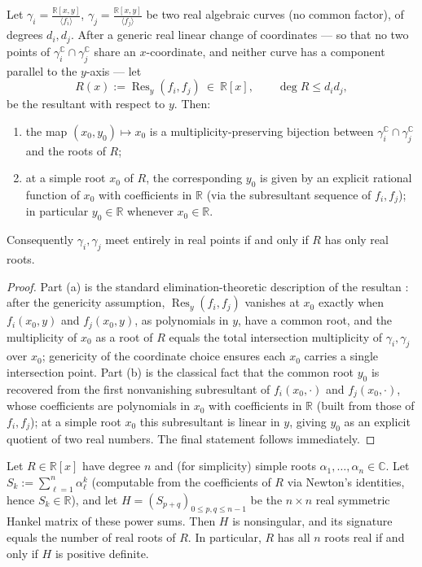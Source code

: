 \documentclass[article,11pt]{amsart} \numberwithin{equation}{section}
\numberwithin{equation}{section}
\begin{document}
{\begin{inp}
	\label{prop:hermite}
	Let $\gamma_i=\frac{\mathbb R [x,y]}{\langle f_i\rangle}$, $\gamma_j=\frac{\mathbb R [x,y]}{\langle f_j\rangle}$ be two real algebraic curves (no
	common factor), of degrees $d_i,d_j$. After a generic real linear change of
	coordinates --- so that no two points of $\gamma_i^\mathbb C\cap \gamma_j^\mathbb C$ share an
	$x$-coordinate, and neither curve has a component parallel to the $y$-axis
	--- let
	\[
	R(x):=\operatorname{Res}_y(f_i,f_j)\ \in\ \mathbb R[x],\qquad \deg R\le d_id_j,
	\]
	be the resultant with respect to $y$. Then:
	\begin{enumerate}
		\item the map $(x_0,y_0)\longmapsto x_0$ is a multiplicity-preserving bijection
		between $\gamma_i^\mathbb C\cap \gamma_j^\mathbb C$ and the roots of $R$;
		\item at a simple root $x_0$ of $R$, the corresponding $y_0$ is given by an
		explicit rational function of $x_0$ with coefficients in $\mathbb R$ (via the
		subresultant sequence of $f_i,f_j$); in particular $y_0\in\mathbb R$ whenever
		$x_0\in\mathbb R$.
	\end{enumerate}
	Consequently $\gamma_i,\gamma_j$ meet entirely in real points if and only if $R$ has
	only real roots.
\end{inp}

\begin{proof}
	Part (a) is the standard elimination-theoretic description of the resultan \cite{BasuPollackRoy}: after the genericity assumption, $\operatorname{Res}_y(f_i,f_j)$ vanishes at
	$x_0$ exactly when $f_i(x_0,y)$ and $f_j(x_0,y)$, as polynomials in $y$,
	have a common root, and the multiplicity of $x_0$ as a root of $R$ equals
	the total intersection multiplicity of $\gamma_i,\gamma_j$ over $x_0$; genericity of
	the coordinate choice ensures each $x_0$ carries a single intersection
	point. Part (b) is the classical fact that the common root $y_0$ is
	recovered from the first nonvanishing subresultant of $f_i(x_0,\cdot)$ and
	$f_j(x_0,\cdot)$, whose coefficients are polynomials in $x_0$ with
	coefficients in $\mathbb R$ (built from those of $f_i,f_j$); at a simple root
	$x_0$ this subresultant is linear in $y$, giving $y_0$ as an explicit
	quotient of two real numbers. The final statement follows immediately.
\end{proof}

\begin{inp}
	\label{prop:hermite2}
	Let $R\in\mathbb R[x]$ have degree $n$ and (for simplicity) simple roots
	$\alpha_1,\dots,\alpha_n\in\mathbb C$. Let $S_k:=\sum_{\ell=1}^n \alpha_\ell^k$
	(computable from the coefficients of $R$ via Newton's identities, hence
	$S_k\in\mathbb R$), and let $H=(S_{p+q})_{0\le p,q\le n-1}$ be the $n\times n$
	real symmetric Hankel matrix of these power sums. Then $H$ is nonsingular,
	and its signature equals the number of real roots of $R$. In particular,
	$R$ has all $n$ roots real if and only if $H$ is positive definite.
\end{inp}

}
\end{document}
